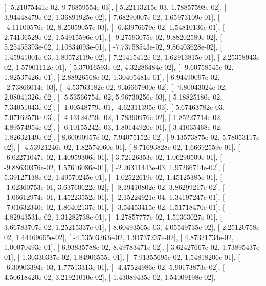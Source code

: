 \documentclass{article}
\begin{document}
       [ -5.21075441e-02,   9.76859554e-03],
       [  5.22113215e-03,   1.78857598e-02],
       [  3.94448479e-02,   1.36891925e-02],
       [  7.68290007e-02,   1.65973109e-01],
       [ -4.11100576e-02,   8.25059057e-03],
       [ -6.43976679e-02,   1.54810136e-01],
       [  2.74136529e-02,   1.54915596e-01],
       [ -9.27593075e-02,   9.88202589e-02],
       [  5.25455393e-02,   1.10834093e-01],
       [ -7.73758543e-02,   9.86403628e-02],
       [  1.45941001e-03,   1.80572119e-02],
       [  7.21415412e-02,   1.62913815e-01],
       [  2.25358943e-02,   1.57901112e-01],
       [  5.37016593e-02,   4.32286484e-02],
       [ -9.60758545e-02,   1.82537426e-01],
       [  2.88926568e-02,   1.30405481e-01],
       [  6.94490097e-02,  -2.73866014e-03],
       [ -4.53763182e-02,   9.46667900e-02],
       [ -9.80043024e-02,   2.08041326e-02],
       [ -5.53566754e-02,   5.96730256e-03],
       [  5.18825180e-02,   7.34051043e-02],
       [ -1.00548779e-01,  -4.62311395e-03],
       [  5.67463782e-03,   7.07162570e-03],
       [ -4.13124259e-02,   1.78390976e-02],
       [  1.85227714e-02,   4.89574954e-02],
       [ -6.10155242e-03,   1.80144920e-01],
       [  3.41035468e-02,   1.82632149e-02],
       [  8.60090957e-02,   7.94075152e-02],
       [  9.13573875e-02,   5.78053117e-02],
       [ -4.53921246e-02,   1.82574060e-01],
       [  8.71693828e-02,   1.66692559e-01],
       [ -6.02271047e-02,   1.40959306e-01],
       [  3.72126353e-02,   1.06290509e-01],
       [ -9.88630376e-02,   1.57616086e-01],
       [ -2.26311443e-03,   1.97266714e-02],
       [  5.39127138e-02,   1.49570245e-01],
       [ -1.02522619e-02,   1.45125385e-01],
       [ -1.02360753e-01,   3.63760622e-02],
       [ -8.19410802e-02,   3.86299217e-02],
       [ -1.06612974e-01,   1.45223552e-01],
       [ -2.15224921e-04,   1.34197247e-01],
       [ -7.01632340e-02,   1.86402137e-01],
       [ -3.54453415e-02,   1.51718470e-01],
       [  4.82943531e-02,   1.31282738e-01],
       [ -1.27857777e-02,   1.51363027e-01],
       [  3.66783707e-02,   1.25215337e-01],
       [  8.60493565e-03,   4.05549735e-02],
       [  2.25120758e-02,   1.44469665e-02],
       [ -4.53503263e-02,   1.94737237e-02],
       [  4.87321734e-02,   1.00070493e-01],
       [  6.93835788e-02,   8.49783471e-02],
       [  3.62427667e-02,   1.73895437e-01],
       [  1.30330337e-02,   1.84906555e-01],
       [ -7.91355695e-02,   1.54818206e-01],
       [ -6.30903394e-03,   1.77513313e-01],
       [ -4.47524986e-02,   5.90173873e-02],
       [  4.50618420e-02,   3.21921010e-02],
       [  1.43089435e-02,   1.54009198e-02],
\end{document}
